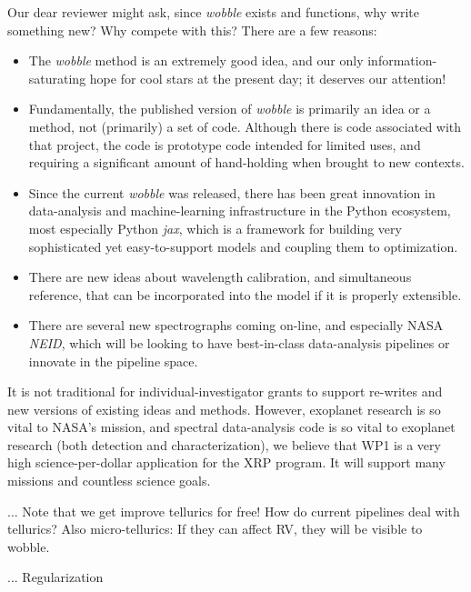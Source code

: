 \documentclass[12pt]{article}
\begin{document}
Our dear reviewer might ask, since \textsl{wobble} exists and functions, why write something new? Why compete with this?
There are a few reasons:
\begin{itemize}
    \item The \textsl{wobble} method is an extremely good idea, and our only information-saturating hope for cool stars at the present day; it deserves our attention!
    \item Fundamentally, the published version of \textsl{wobble} is primarily an idea or a method, not (primarily) a set of code. Although there is code associated with that project, the code is prototype code intended for limited uses, and requiring a significant amount of hand-holding when brought to new contexts.
    \item Since the current \textsl{wobble} was released, there has been great innovation in data-analysis and machine-learning infrastructure in the Python ecosystem, most especially Python \textsl{jax}, which is a framework for building very sophisticated yet easy-to-support models and coupling them to optimization.
    \item There are new ideas about wavelength calibration, and simultaneous reference, that can be incorporated into the model if it is properly extensible.
    \item There are several new spectrographs coming on-line, and especially NASA \textsl{NEID}, which will be looking to have best-in-class data-analysis pipelines or innovate in the pipeline space.
\end{itemize}
It is not traditional for individual-investigator grants to support re-writes and new versions of existing ideas and methods.
However, exoplanet research is so vital to NASA's mission, and spectral data-analysis code is so vital to exoplanet research (both detection and characterization), we believe that WP1 is a very high science-per-dollar application for the XRP program.
It will support many missions and countless science goals.

... Note that we get improve tellurics for free! How do current pipelines deal with tellurics? Also micro-tellurics: If they can affect RV, they will be visible to wobble.

... Regularization
\end{document}
